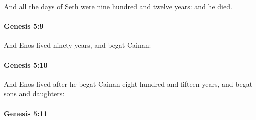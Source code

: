 			And all the days of Seth were nine hundred and twelve years: and he died.


		\paragraph{Genesis 5:9} %
			\label{GENESIS-5-9}

			And Enos lived ninety years, and begat Cainan:


		\paragraph{Genesis 5:10} %
			\label{GENESIS-5-10}

			And Enos lived after he begat Cainan eight hundred and fifteen years, and begat sons and daughters:


		\paragraph{Genesis 5:11} %
			\label{GENESIS-5-11}

